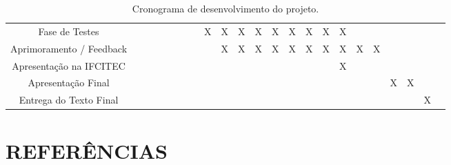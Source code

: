 \documentclass[12pt,a4paper]{article}
\begin{document}
\begin{table}[htb]
\begin{center}
{\begin{tabular}{| c | c *{10}{ c | c } c|}
						 Fase de Testes            &   &   &   &   &   &   &   & X & X & X & X & X & X & X & X & X &   &   &   &   &   &   \\
						 Aprimoramento / Feedback  &   &   &   &   &   &   &   &   & X & X & X & X & X & X & X & X & X & X &   &   &   &   \\
						 Apresentação na IFCITEC   &   &   &   &   &   &   &   &   &   &   &   &   &   &   &   & X &   &   &   &   &   &   \\
						 Apresentação Final        &   &   &   &   &   &   &   &   &   &   &   &   &   &   &   &   &   &   & X & X &   &   \\
						 Entrega do Texto Final    &   &   &   &   &   &   &   &   &   &   &   &   &   &   &   &   &   &   &   &   & X &   \\
						 \hline
					\end{tabular}
			}
			\caption{Cronograma de desenvolvimento do projeto.}
		\end{center}
	\end{table}
	\newpage
	\section*{REFERÊNCIAS}

		\printbibliography[heading=none]

		\newpage
\end{document}
